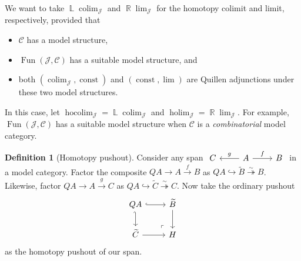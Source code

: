 \documentclass[10pt,letterpaper,cm]{nupset}
\theoremstyle{definition}
\newtheorem{defn}{Definition}[subsection]
\theoremstyle{theorem}
\theoremstyle{remark}
\DeclareMathOperator{\Ll}{\mathbb L}
\DeclareMathOperator{\R}{\mathbb{R}}
\newcommand{\1}{\mathbb{1}}
\renewcommand{\c}{\mathcal{C}}
\renewcommand{\j}{\mathcal{J}}
\newcommand{\0}{\vec 0}
\DeclareMathOperator{\fun}{Fun}
\DeclareMathOperator{\colim}{colim}
\DeclareMathOperator{\hocolim}{hocolim}
\DeclareMathOperator{\holim}{holim}
\DeclareMathOperator{\const}{const}
\newcommand{\bi}{\begin{itemize}}
\newcommand{\ei}{\end{itemize}}
\begin{document}
\medskip

We want to take $\Ll{\colim_{\j}}$ and $\R{\lim_{\j}}$ for the homotopy colimit and limit, respectively, provided that 
\bi
\item $\c$ has a model structure,
\item $\fun(\j, \c)$ has a suitable model structure, and
\item both $\left(\colim_{\j}, \const\right)$ and $\left(\const, \lim\right)$ are Quillen adjunctions under these two model structures. 
\ei
In this case, let $\hocolim_{\j} = \Ll{\colim_{\j}}$ and $\holim_{\j} = \R{\lim_{\j}}$. For example, $\fun(\j, \c)$ has a suitable model structure when $\c$ is a \textit{combinatorial} model category. 

\begin{defn}[Homotopy pushout]
Consider any span $\begin{tikzcd}
	C & A & B
	\arrow["g"', from=1-2, to=1-1]
	\arrow["f", from=1-2, to=1-3]
\end{tikzcd}$
in a model category. Factor the composite $Q{A}\to  A \xrightarrow{f} B$ as $Q{A} \hookrightarrow \widetilde{B} \overset{\sim}{\twoheadrightarrow} B$. Likewise, factor $Q{A} \to A \xrightarrow{g} C$   as
$Q{A} \hookrightarrow \widetilde{C} \overset{\sim}{\twoheadrightarrow} C$. Now take the ordinary pushout
\[
\begin{tikzcd}
	{Q{A}} & {\widetilde{B}} \\
	{\widetilde{C}} & H
	\arrow[hook, from=1-1, to=1-2]
	\arrow[hook', from=1-1, to=2-1]
	\arrow[from=2-1, to=2-2]
	\arrow[from=1-2, to=2-2]
	\arrow["\lrcorner"{anchor=center, pos=0.125, rotate=180}, draw=none, from=2-2, to=1-1]
\end{tikzcd}
\] as the homotopy pushout  of our span.
\end{defn}
\end{document}
